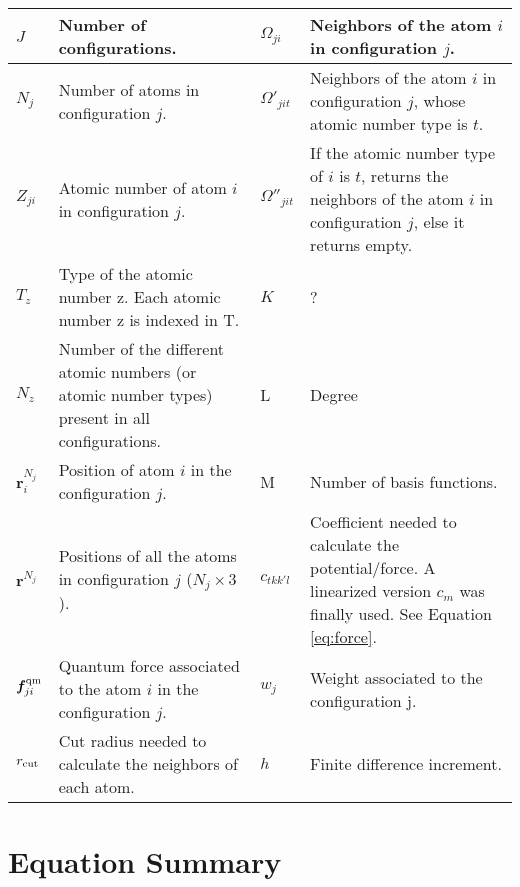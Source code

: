 \documentclass[12pt]{article}
\begin{document}
\begin{center}
    \label{table:def}
    \begin{tabular}{ | l | p{7.5cm} | l | p{7.5cm} |}
    \hline
    $J$ & Number of configurations. & $\Omega_{ji}$ & Neighbors of the atom $i$ in configuration $j$. \\ \hline
    
    $N_j$ & Number of atoms in configuration $j$. & $\Omega'_{jit}$ & Neighbors of the atom $i$ in configuration $j$, whose atomic number type is $t$. \\ \hline
    
    $Z_{ji}$ & Atomic number of atom $i$ in configuration $j$. & $\Omega''_{jit}$ & If the atomic number type of $i$ is $t$, returns the neighbors of the atom $i$ in configuration $j$, else it returns empty. \\ \hline
    
    $T_z$ & Type of the atomic number z. Each atomic number z is indexed in T. & $K$ & ? \\ \hline
    
    $N_z$ & Number of the different atomic numbers (or atomic number types) present in all configurations. &  L & Degree \\ \hline
    
    $\bm {r}^{N_j}_{i}$ & Position of atom $i$ in the configuration $j$. & M & Number of basis functions.\\ \hline
    
    $\bm {r}^{N_j}$ & Positions of all the atoms in configuration $j$ ($N_j \times 3$). & $c_{tkk'l}$  & Coefficient needed to calculate the potential/force. A linearized version $c_{m}$ was finally used. See Equation \ref{eq:force}.\\ \hline %
    
    $\bm f^{\rm qm}_{ji}$ & Quantum force associated to the atom $i$ in the configuration $j$. & $w_j$ & Weight associated to the configuration j. \\ \hline
    
    $r_{\rm cut}$ & Cut radius needed to calculate the neighbors of each atom. &  $h$ & Finite difference increment. \\
    \hline
    \end{tabular}
\end{center}

\section{Equation Summary}
\end{document}
